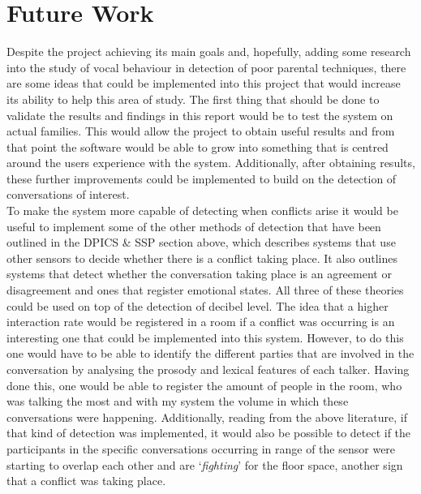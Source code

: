 \documentclass[a4paper,11pt]{report}
\begin{document}
\section{Future Work}
Despite the project achieving its main goals and, hopefully, adding some research into the study of vocal behaviour in detection of poor parental techniques, there are some ideas that could be implemented into this project that would increase its ability to help this area of study. The first thing that should be done to validate the results and findings in this report would be to test the system on actual families. This would allow the project to obtain useful results and from that point the software would be able to grow into something that is centred around the users experience with the system. Additionally, after obtaining results, these further improvements could be implemented to build on the detection of conversations of interest.\\

To make the system more capable of detecting when conflicts arise it would be useful to implement some of the other methods of detection that have been outlined in the DPICS \& SSP section above, which describes systems that use other sensors to decide whether there is a conflict taking place. It also outlines systems that detect whether the conversation taking place is an agreement or disagreement and ones that register emotional states. All three of these theories could be used on top of the detection of decibel level. The idea that a higher interaction rate would be registered in a room if a conflict was occurring is an interesting one that could be implemented into this system. However, to do this one would have to be able to identify the different parties that are involved in the conversation by analysing the prosody and lexical features of each talker. Having done this, one would be able to register the amount of people in the room, who was talking the most and with my system the volume in which these conversations were happening. Additionally, reading from the above literature, if that kind of detection was implemented, it would also be possible to detect if the participants in the specific conversations occurring in range of the sensor were starting to overlap each other and are ‘\textit{fighting}’ for the floor space, another sign that a conflict was taking place.\\
\end{document}
